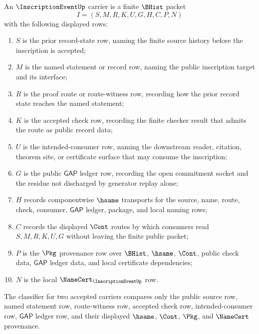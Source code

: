 \begin{definition}
\label{def:inscription-event-namecert-carrier}
An $\InscriptionEventUp$ carrier is a finite $\BHist$ packet
$$
I=(S,M,R,K,U,G,H,C,P,N)
$$
with the following displayed rows:
\begin{enumerate}
\item $S$ is the prior record-state row, naming the finite source history before the inscription is accepted;
\item $M$ is the named statement or record row, naming the public inscription target and its interface;
\item $R$ is the proof route or route-witness row, recording how the prior record state reaches the named statement;
\item $K$ is the accepted check row, recording the finite checker result that admits the route as public record data;
\item $U$ is the intended-consumer row, naming the downstream reader, citation, theorem site, or certificate surface that may consume the inscription;
\item $G$ is the public $\mathsf{GAP}$ ledger row, recording the open commitment socket and the residue not discharged by generator replay alone;
\item $H$ records componentwise $\hsame$ transports for the source, name, route, check, consumer, $\mathsf{GAP}$ ledger, package, and local naming rows;
\item $C$ records the displayed $\Cont$ routes by which consumers read $S,M,R,K,U,G$ without leaving the finite public packet;
\item $P$ is the $\Pkg$ provenance row over $\BHist$, $\hsame$, $\Cont$, public check data, $\mathsf{GAP}$ ledger data, and local certificate dependencies;
\item $N$ is the local $\NameCert_{\InscriptionEventUp}$ row.
\end{enumerate}
The classifier for two accepted carriers compares only the public source row, named statement row, route-witness row, accepted check row, intended-consumer row, $\mathsf{GAP}$ ledger row, and their displayed $\hsame$, $\Cont$, $\Pkg$, and $\NameCert$ provenance.
\end{definition}

